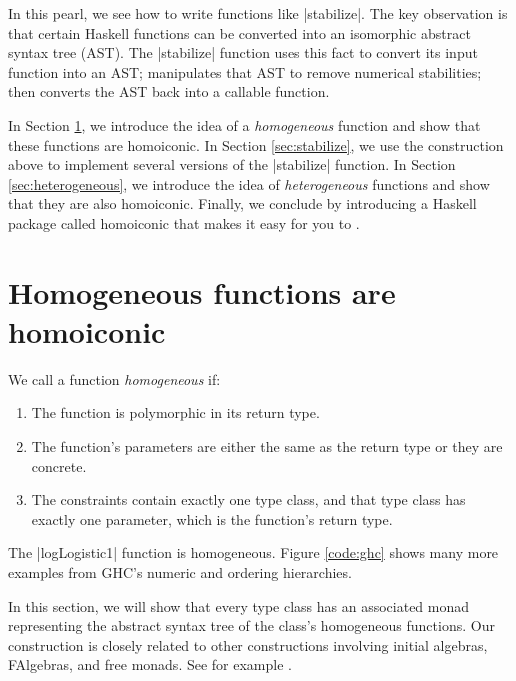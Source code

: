 \documentclass[preprint]{sigplanconf}
\theoremstyle{definition}
\begin{document}
In this pearl, we see how to write functions like |stabilize|.
The key observation is that certain Haskell functions can be converted into an isomorphic abstract syntax tree (AST).
The |stabilize| function uses this fact to convert its input function into an AST;
manipulates that AST to remove numerical stabilities;
then converts the AST back into a callable function.

In Section \ref{sec:homogeneous}, we introduce the idea of a \emph{homogeneous} function and show that these functions are homoiconic.
In Section \ref{sec:stabilize}, we use the construction above to implement several versions of the |stabilize| function.
In Section \ref{sec:heterogeneous}, we introduce the idea of \emph{heterogeneous} functions and show that they are also homoiconic.
Finally, we conclude by introducing a Haskell package called {\ttfamily homoiconic} that makes it easy for you to .

\section{Homogeneous functions are homoiconic}
\label{sec:homogeneous}
We call a function \emph{homogeneous} if:
\begin{enumerate}
\item
The function is polymorphic in its return type.
\item
The function's parameters are either the same as the return type or they are concrete.
\item
The constraints contain exactly one type class, and
that type class has exactly one parameter,
which is the function's return type.
\end{enumerate}
The |logLogistic1| function is homogeneous.
Figure \ref{code:ghc} shows many more examples from GHC's numeric and ordering hierarchies.

In this section, we will show that every type class has an associated monad representing the abstract syntax tree of the class's homogeneous functions.
Our construction is closely related to other constructions involving initial algebras, FAlgebras, and free monads.
See for example \cite{swierstra2008}.
\end{document}
